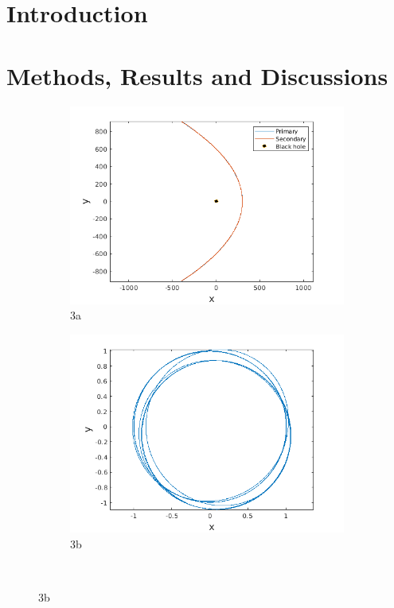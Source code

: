 \documentclass[a4paper]{article}
\begin{document}

		\section{Introduction} \label{3:introduction}

		
		\section{Methods, Results and Discussions}
		
			
			\begin{figure} [h]
				\begin{subfigure} {.5\columnwidth}
					\includegraphics[width=\columnwidth]{../plots/3a_orbits_equalaxes.png}
					\caption{3a}
					\label{fig:3a}
				\end{subfigure}
				\hfill
				\begin{subfigure} {.5\columnwidth}
					\includegraphics[width=\columnwidth]{../plots/3b_secondaryorbit.png}
					\caption{3b}
					\label{fig:3b}
				\end{subfigure}\\
				

\end{figure}
\end{document}
